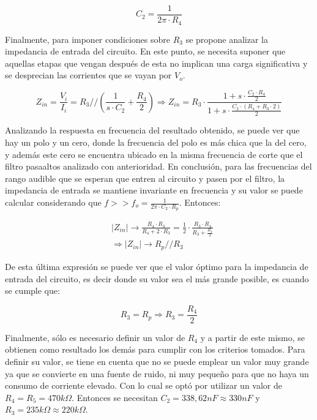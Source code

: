 \begin{equation}
    C_2 = \frac{1}{2 \pi \cdot R_4}
    \label{eq:capa_offset}
\end{equation}

Finalmente, para imponer condiciones sobre $R_3$ se propone analizar la impedancia de entrada del circuito. En este punto, se necesita suponer
que aquellas etapas que vengan despu\'es de esta no implican una carga significativa y se desprecian las corrientes que se vayan por $V_o$.

\begin{equation*}
    Z_{in} = \frac{V_i}{I_i} = R_3 // \left( \frac{1}{s \cdot C_2} + \frac{R_4}{2} \right)
    \Rightarrow
    Z_{in} = R_3 \cdot \frac{1+ s \cdot \frac{C_2 \cdot R_4}{2}}{1 + s \cdot \frac{C_2 \cdot (R_4 + R_3 \cdot 2)}{2}}
\end{equation*}

Analizando la respuesta en frecuencia del resultado obtenido, se puede ver que hay un polo y un cero, donde la frecuencia del polo es m\'as chica que la del cero,
y adem\'as este cero se encuentra ubicado en la misma frecuencia de corte que el filtro pasaaltos analizado con anterioridad. En conclusi\'on, para las frecuencias del rango
audible que se esperan que entren al circuito y pasen por el filtro, la impedancia de entrada se mantiene invariante en frecuencia y su valor se puede calcular considerando
que $f >> f_o = \frac{1}{2 \pi \cdot C_2 \cdot R_p}$. Entonces:

\begin{align*}
    & |Z_{in}| \rightarrow \frac{R_4 \cdot R_3}{R_4 + 2 \cdot R_3} = \frac{1}{2} \cdot \frac{R_3 \cdot R_4}{R_3 + \frac{R_4}{2}} \\
    & \Rightarrow |Z_{in}| \rightarrow R_p // R_3
\end{align*}

De esta \'ultima expresi\'on se puede ver que el valor \'optimo para la impedancia de entrada del circuito, es decir donde su valor
sea el m\'as grande posible, es cuando se cumple que:

\begin{equation}
    R_3 = R_p \Rightarrow R_3 = \frac{R_4}{2}
\end{equation}

Finalmente, s\'olo es necesario definir un valor de $R_4$ y a partir de este mismo, se obtienen como resultado los dem\'as para cumplir con los criterios tomados. Para definir su valor,
se tiene en cuenta que no se puede emplear un valor muy grande ya que se convierte en una fuente de ruido, ni muy peque\~no para que no haya un consumo de corriente elevado. Con lo cual se opt\'o por utilizar
un valor de $R_4 = R_5 = 470k \Omega$. Entonces se necesitan $C_2 = 338,62nF \approx 330nF$ y $R_3 = 235k \Omega \approx 220k \Omega$.

